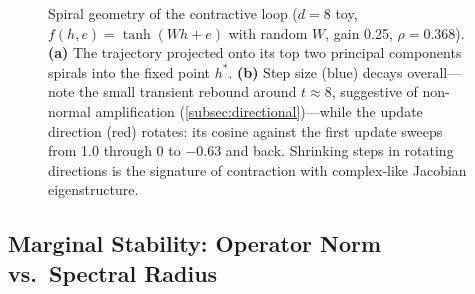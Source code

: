 \documentclass[11pt]{article}
\begin{document}
\begin{figure}[ht]
\begin{minipage}{0.54\textwidth}
\end{minipage}
\caption{Spiral geometry of the contractive loop ($d=8$ toy, $f(h,e)=\tanh(Wh+e)$ with random $W$, gain 0.25, $\rho=0.368$). \textbf{(a)} The trajectory projected onto its top two principal components spirals into the fixed point $h^*$. \textbf{(b)} Step size (blue) decays overall---note the small transient rebound around $t \approx 8$, suggestive of non-normal amplification (\cref{subsec:directional})---while the update direction (red) rotates: its cosine against the first update sweeps from 1.0 through 0 to $-0.63$ and back. Shrinking steps in rotating directions is the signature of contraction with complex-like Jacobian eigenstructure.}
\label{fig:spiral}
\end{figure}

\subsection{Marginal Stability: Operator Norm vs.\ Spectral Radius}
\end{document}
